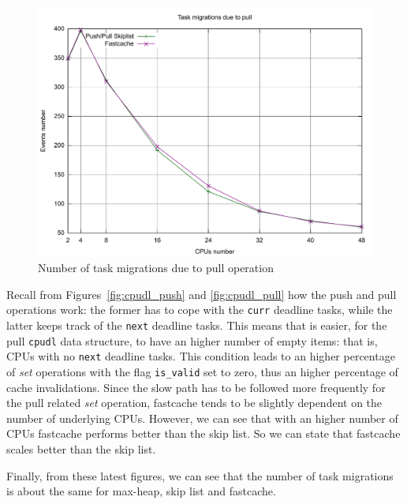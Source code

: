 \begin{figure}[htbp]
    \includegraphics[width=\columnwidth]{images/fastcache_pulled_here}
    \caption{Number of task migrations due to pull operation}
    \label{fig:fastcache_pulled_here}
\end{figure}

Recall from Figures~\ref{fig:cpudl_push} and \ref{fig:cpudl_pull}
how the push and pull operations work: the former
has to cope with the \texttt{curr} deadline tasks, while the latter keeps
track of the \texttt{next} deadline tasks. This means that is easier, for
the pull \texttt{cpudl} data structure, to have an higher number of empty
items: that is, CPUs with no \texttt{next} deadline tasks. This condition
leads to an higher percentage of \emph{set} operations with the flag
\texttt{is\_valid} set to zero, thus an higher percentage of cache
invalidations. Since the slow path has to be followed more frequently for
the pull related \emph{set} operation, fastcache tends to be slightly dependent 
on the number of underlying CPUs. However, we can see that with an higher
number of CPUs fastcache performs better than the skip list. So we can state 
that fastcache scales better than the skip list.

Finally, from these latest figures, we can see that the number of task
migrations is about the same for max-heap, skip list and fastcache.
